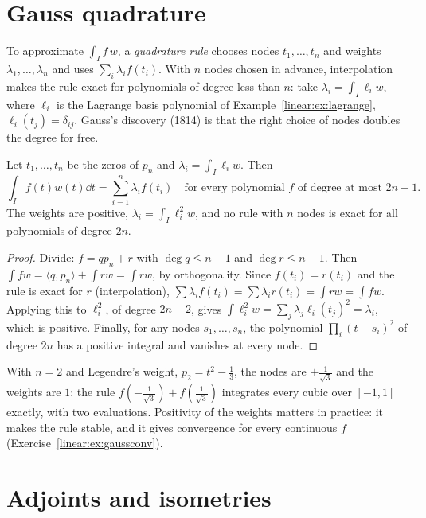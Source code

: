 \section{Gauss quadrature}

To approximate $\int_If\,w$, a \emph{quadrature rule} chooses nodes $t_1,\dots,t_n$ and weights $\lambda_1,\dots,\lambda_n$
and uses $\sum_i\lambda_if(t_i)$. With $n$ nodes chosen in advance, interpolation makes the rule exact for polynomials
of degree less than $n$: take $\lambda_i=\int_I\ell_iw$, where $\ell_i$ is the Lagrange basis polynomial of
Example~\ref{linear:ex:lagrange}, $\ell_i(t_j)=\delta_{ij}$. Gauss's discovery (1814) is that the right choice of nodes doubles
the degree for free.

\begin{theorem}\label{linear:thm:gaussquad}
Let $t_1,\dots,t_n$ be the zeros of $p_n$ and $\lambda_i=\int_I\ell_iw$. Then
\[
\int_If(t)w(t)\dd t=\sum_{i=1}^n\lambda_if(t_i)\quad\text{for every polynomial $f$ of degree at most $2n-1$.}
\]
The weights are positive, $\lambda_i=\int_I\ell_i^2w$, and no rule with $n$ nodes is exact for all polynomials of degree
$2n$.
\end{theorem}
\begin{proof}
Divide: $f=qp_n+r$ with $\deg q\le n-1$ and $\deg r\le n-1$. Then $\int fw=\langle q,p_n\rangle+\int rw=\int rw$, by
orthogonality. Since $f(t_i)=r(t_i)$ and the rule is exact for $r$ (interpolation), $\sum\lambda_if(t_i)=\sum\lambda_ir(t_i)
=\int rw=\int fw$. Applying this to $\ell_i^2$, of degree $2n-2$, gives $\int\ell_i^2w=\sum_j\lambda_j\ell_i(t_j)^2=\lambda_i$,
which is positive. Finally, for any nodes $s_1,\dots,s_n$, the polynomial $\prod_i(t-s_i)^2$ of degree $2n$ has a positive
integral and vanishes at every node.
\end{proof}

With $n=2$ and Legendre's weight, $p_2=t^2-\frac13$, the nodes are $\pm\frac1{\sqrt3}$ and the weights are $1$: the rule
$f(-\frac1{\sqrt3})+f(\frac1{\sqrt3})$ integrates every cubic over $[-1,1]$ exactly, with two evaluations. Positivity of the
weights matters in practice: it makes the rule stable, and it gives convergence for every continuous $f$ (Exercise~\ref{linear:ex:gaussconv}).

\section{Adjoints and isometries}\label{linear:sec:adjoint}

